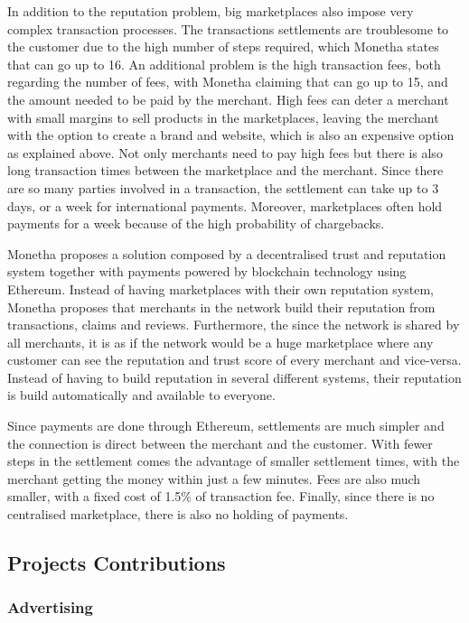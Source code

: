 In addition to the reputation problem, big marketplaces also impose very complex transaction processes. The transactions settlements are troublesome to the customer due to the high number of steps required, which Monetha states that can go up to 16. An additional problem is the high transaction fees, both regarding the number of fees, with Monetha claiming that can go up to 15, and the amount needed to be paid by the merchant. High fees can deter a merchant with small margins to sell products in the marketplaces, leaving the merchant with the option to create a brand and website, which is also an expensive option as explained above. Not only merchants need to pay high fees but there is also long transaction times between the marketplace and the merchant. Since there are so many parties involved in a transaction, the settlement can take up to 3 days, or a week for international payments. Moreover, marketplaces often hold payments for a week because of the high probability of chargebacks.

Monetha proposes a solution composed by a decentralised trust and reputation system together with payments powered by blockchain technology using Ethereum. Instead of having marketplaces with their own reputation system, Monetha proposes that merchants in the network build their reputation from transactions, claims and reviews. Furthermore, the since the network is shared by all merchants, it is as if the network would be a huge marketplace where any customer can see the reputation and trust score of every merchant and vice-versa. Instead of having to build reputation in several different systems, their reputation is build automatically and available to everyone.

Since payments are done through Ethereum, settlements are much simpler and the connection is direct between the merchant and the customer. With fewer steps in the settlement comes the advantage of smaller settlement times, with the merchant getting the money within just a few minutes. Fees are also much smaller, with a fixed cost of 1.5\% of transaction fee. Finally, since there is no centralised marketplace, there is also no holding of payments.

\subsection{Projects Contributions}
\subsubsection{Advertising}

